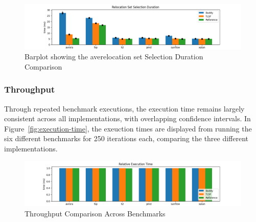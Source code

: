 \begin{figure}[H]
\centering
\includegraphics[width=1\textwidth]{figures/set_selection.png}
\caption{Barplot showing the averelocation set Selection Duration Comparison}
\label{fig:set-selection}
\end{figure}


\subsubsection{Throughput}
Through repeated benchmark executions, the execution time remains largely consistent across all implementations, with overlapping confidence intervals. In Figure~\ref{fig:execution-time}, the exeuction times are displayed from running the six different benchmarks for 250 iterations each, comparing the three different implementations.

\begin{figure}[H]
  \centering
\includegraphics[width=1\textwidth]{figures/execution_time.png}
\caption{Throughput Comparison Across Benchmarks}
\label{fig:exeuction-time}
\end{figure}
